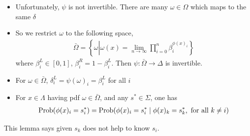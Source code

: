 \documentclass[12pt,t]{beamer}
\begin{document}
\begin{frame}

\begin{itemize}\setlength{\parskip}{0pt}  \setlength{\itemsep}{5pt} \setlength{\topsep}{0pt}
   \item Unfortunately, $\psi$ is not invertible. There are many $\omega\in \Omega$ which maps to the same $\delta$
   \item So we restrict $\omega$ to the following space,
        \begin{eqnarray}
        \label{DefOmegabar}
        \bar{\Omega} = \left\{ \omega \left| \omega(x) = \lim_{n \rightarrow \infty} \prod_{i=0}^n \beta^{\phi(x)_i}_i \right. \right\}
        \end{eqnarray}
        where $\beta^L_i \in [0,1]$, $\beta^R_i=1-\beta^L_i$.
         Then $\psi:\bar{\Omega} \rightarrow \Delta$ is invertible.

    \item For $\omega \in \bar{\Omega}$, $\delta^L_i=\psi(\omega)_i = \beta^L_i$ for all $i$
    \item For $x \in \Lambda$ having pdf $\omega\in \bar{\Omega}$, and any $s^*\in \Sigma$, one has
         \begin{eqnarray*}
             \operatorname{Prob}(\phi(x)_i=s_i^*) = 
             \operatorname{Prob}(\phi(x)_i=s_i^* \mid  \phi(x)_k=s_k^*, \text{ for all } k \neq i )
          \end{eqnarray*}


\end{itemize}

This lemma says given $s_k$ does not help to know $s_i$. 


\end{frame}
\end{document}
